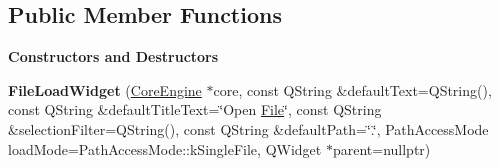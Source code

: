 \subsection*{Public Member Functions}
\begin{Indent}\textbf{ Constructors and Destructors}\par
\begin{DoxyCompactItemize}
\item 
\mbox{\label{classrev_1_1_view_1_1_file_load_widget_a4adf587aac591f95f8792021c710a37c}} 
{\bfseries File\+Load\+Widget} (\mbox{\hyperlink{classrev_1_1_core_engine}{Core\+Engine}} $\ast$core, const Q\+String \&default\+Text=Q\+String(), const Q\+String \&default\+Title\+Text=\char`\"{}Open \mbox{\hyperlink{class_file}{File}}\char`\"{}, const Q\+String \&selection\+Filter=Q\+String(), const Q\+String \&default\+Path=\char`\"{}.\char`\"{}, Path\+Access\+Mode load\+Mode=Path\+Access\+Mode\+::k\+Single\+File, Q\+Widget $\ast$parent=nullptr)
\end{DoxyCompactItemize}
\end{Indent}

